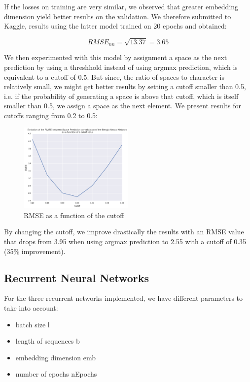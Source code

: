 \documentclass[11pt]{article}
\begin{document}
If the losses on training are very similar, we observed that greater embedding dimension yield better results on the validation. We therefore submitted to Kaggle, results using the latter model trained on 20 epochs and obtained:

$$RMSE_{nn} = \sqrt{13.37} = 3.65$$

We then experimented with this model by assignment a space as the next prediction by using a threshhold instead of using argmax prediction, which is equivalent to a cutoff of 0.5. But since, the ratio of spaces to character is relatively small, we might get better results by setting a cutoff smaller than 0.5, i.e. if the probability of generating a space is above that cutoff, which is itself smaller than 0.5, we assign a space as the next element. We present results for cutoffs ranging from 0.2 to 0.5:

\begin{figure}[H]
\begin{center}
    \includegraphics[width=0.5\textwidth]{cutoff}
    \caption{RMSE as a function of the cutoff}
\end{center}
\end{figure}

By changing the cutoff, we improve drastically the results with an RMSE value that drops from 3.95 when using argmax prediction to 2.55 with a cutoff of 0.35 (35\% improvement).

\subsection{Recurrent Neural Networks}

For the three recurrent networks implemented, we have different parameters to take into account: 
\begin{itemize}
	\item batch size l
	\item length of sequences b
	\item embedding dimension emb
	\item number of epochs nEpochs
\end{itemize}
\end{document}
